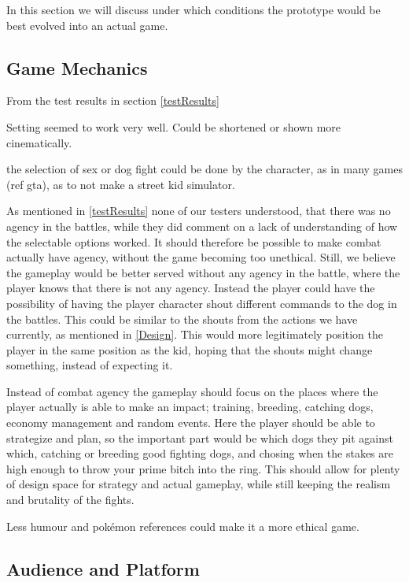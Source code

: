 In this section we will discuss under which conditions the prototype would be best evolved into an actual game.

\subsection{Game Mechanics}
From the test results in section \ref{testResults}

Setting seemed to work very well.  Could be shortened or shown more cinematically.\

the selection of sex or dog fight could be done by the character, as in many games (ref gta), as to not make a street kid simulator.\

As mentioned in \ref{testResults} none of our testers understood, that there was no agency in the battles, while they did comment on a lack of understanding of how the selectable options worked. It should therefore be possible to make combat actually have agency, without the game becoming too unethical. Still, we believe the gameplay would be better served without any agency in the battle, where the player knows that there is not any agency. Instead the player could have the possibility of having the player character shout different commands to the dog in the battles. This could be similar to the shouts from the actions we have currently, as mentioned in \ref{Design}. This would more legitimately position the player in the same position as the kid, hoping that the shouts might change something, instead of expecting it.\

Instead of combat agency the gameplay should focus on the places where the player actually is able to make an impact; training, breeding, catching dogs, economy management and random events. Here the player should be able to strategize and plan, so the important part would be which dogs they pit against which, catching or breeding good fighting dogs, and chosing when the stakes are high enough to throw your prime bitch into the ring. This should allow for plenty of design space for strategy and actual gameplay, while still keeping the realism and brutality of the fights. \

Less humour and pokémon references could make it a more ethical game. \

\subsection{Audience and Platform}

